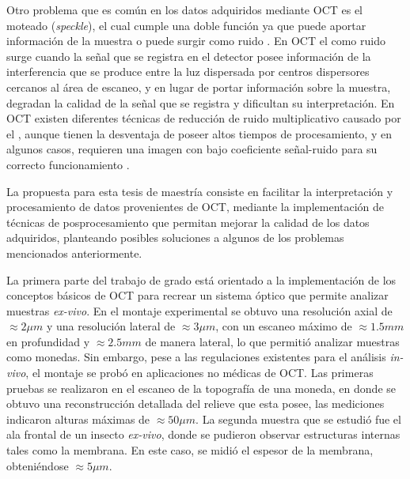 Otro problema que es común en los datos adquiridos mediante OCT es el moteado (\textit{speckle}), el cual cumple una doble función ya que puede aportar información de la muestra o puede surgir como ruido \cite{Schmitt1999,Mariampillai2008}. En OCT el \speckle como ruido surge cuando la señal que se registra en el detector posee información de la interferencia que se produce entre la luz dispersada por centros dispersores cercanos al área de escaneo, y en lugar de portar información sobre la muestra, degradan la calidad de la señal que se registra y dificultan su interpretación. En OCT existen diferentes técnicas de reducción de ruido multiplicativo causado por el \speckle \cite{Hughes2009,Szkulmowski2012,Aum2015}, aunque tienen la desventaja de poseer altos tiempos de procesamiento, y en algunos casos, requieren una imagen con bajo coeficiente señal-ruido para su correcto funcionamiento \cite{Fang2012}.

La propuesta para esta tesis de maestría consiste en facilitar la interpretación y procesamiento de datos provenientes de OCT, mediante la implementación de técnicas de posprocesamiento que permitan mejorar la calidad de los datos adquiridos, planteando posibles soluciones a algunos de los problemas mencionados anteriormente. 

La primera parte del trabajo de grado está orientado a la implementación de los conceptos básicos de OCT para recrear un sistema óptico que permite analizar muestras \textit{ex-vivo}. En el montaje experimental se obtuvo una resolución axial de $\approx2\mu m$ y una resolución lateral de $\approx3 \mu m$, con un escaneo máximo de $\approx1.5mm$ en profundidad y $\approx2.5mm$ de manera lateral, lo que permitió analizar muestras como monedas. Sin embargo, pese a las regulaciones existentes para el análisis \textit{in-vivo}, el montaje se probó en aplicaciones no médicas de OCT. Las primeras pruebas se realizaron en el escaneo de la topografía de una moneda, en donde se obtuvo una reconstrucción detallada del relieve que esta posee, las mediciones indicaron alturas máximas de $\approx50\mu m$. La segunda muestra que se estudió fue el ala frontal de un insecto \textit{ex-vivo}, donde se pudieron observar estructuras internas tales como la membrana. En este caso, se midió el espesor de la membrana, obteniéndose $\approx5\mu m$.

